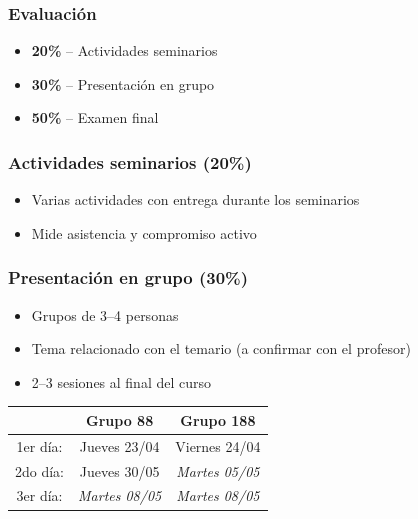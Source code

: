 \begin{frame}
\frametitle{Evaluación}
\centering

\begin{itemize}
  \item \textbf{20\%} -- Actividades seminarios
  \item \textbf{30\%} -- Presentación en grupo
  \item \textbf{50\%} -- Examen final
\end{itemize}

\end{frame}

\begin{frame}
\frametitle{Actividades seminarios (20\%)}
\centering

\begin{itemize}
  \item Varias actividades con entrega durante los seminarios
  \item Mide asistencia y compromiso activo
\end{itemize}

\end{frame}

\begin{frame}
\frametitle{Presentación en grupo (30\%)}
\centering

\begin{itemize}
  \item Grupos de 3--4 personas
  \item Tema relacionado con el temario (a confirmar con el profesor)
  \item 2--3 sesiones al final del curso
\end{itemize}

\vspace{15pt}

\begin{center}
\begin{tabular}{|c|c|c|}
\hline
& \textbf{Grupo 88} & \textbf{Grupo 188} \\
\hline
1er día: & Jueves 23/04 & Viernes 24/04 \\
2do día: & Jueves 30/05 & \textit{Martes 05/05} \\
3er día: & \textit{Martes 08/05} & \textit{Martes 08/05} \\
\hline
\end{tabular}
\end{center}

\end{frame}

